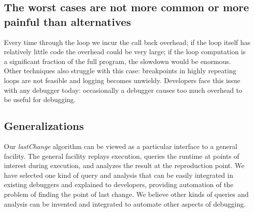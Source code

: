 \documentclass{sig-alternate}
\begin{document}
\subsection{The worst cases are not more common or more painful than alternatives}

Every time through the loop we incur
the call back overhead; if the loop itself has relatively little code
the overhead could be very large; if the loop computation is a
significant fraction of the full program, the slowdown would be
enormous. 
Other techniques also struggle with this case:  breakpoints in highly repeating loops are not feasible and logging
becomes unwieldy. 
Developers face this issue with any debugger today: occasionally a
debugger causes too much overhead to be useful for debugging. 
%

\subsection{Generalizations}
Our \textit{lastChange} algorithm can be viewed as a particular interface to a general facility. 
The general facility replays execution, queries the runtime at points of interest during execution,
and analyzes the result at the reproduction point. We have selected one kind of query and analysis
that can be easily integrated in existing debuggers and explained to developers, providing automation of 
the problem of finding the point of last change. We believe other
kinds of queries and analysis can be invented and integrated to automate other aspects of debugging.
\end{document}
